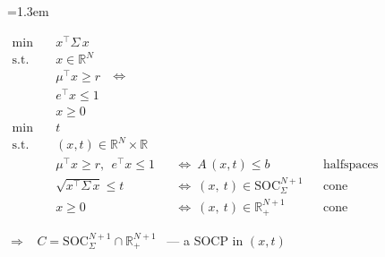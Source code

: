 \documentclass[10pt]{article}
\newenvironment{board}{%
  \par\vspace{4pt}
  \begingroup\leftskip=1.3em\relax\parskip=2pt\relax}{%
  \par\endgroup\vspace{4pt}}
\begin{document}
\begin{board}
\begin{center}
$\begin{aligned}
  \min\quad & x^{\top}\Sigma\, x \\
  \text{s.t.}\quad & x \in \mathbb{R}^N \\
                   & \mu^{\top}x \ge r \\
                   & e^{\top}x \le 1 \\
                   & x \ge 0
\end{aligned}$
\qquad $\iff$ \qquad
$\begin{aligned}
  \min\quad & t \\
  \text{s.t.}\quad & (x, t) \in \mathbb{R}^N \times \mathbb{R} \\
                   & \mu^{\top}x \ge r, \ \ e^{\top}x \le 1 && \iff\ A\,(x, t) \le b
                     && \text{halfspaces} \\
                   & \sqrt{x^{\top}\Sigma\, x} \le t && \iff\ (x,\ t) \in \mathrm{SOC}_{\Sigma}^{N+1}
                     && \text{cone} \\
                   & x \ge 0 && \iff\ (x,\ t) \in \mathbb{R}^{N+1}_+
                     && \text{cone}
\end{aligned}$
\end{center}
\vspace{10pt}

\qquad $\Rightarrow$ \ {$C = \mathrm{SOC}_{\Sigma}^{N+1} \cap \mathbb{R}^{N+1}_+$} \ --- a SOCP in $(x, t)$
\end{board}

\newpage
\end{document}

